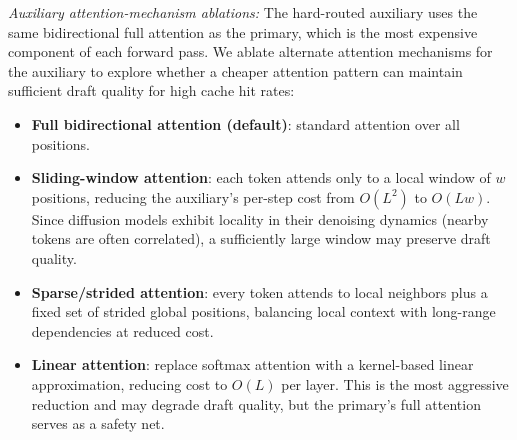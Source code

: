 \documentclass[11pt]{article}
\begin{document}
\emph{Auxiliary attention-mechanism ablations:}
The hard-routed auxiliary uses the same bidirectional full attention as the primary, which is the most expensive component of each forward pass.
We ablate alternate attention mechanisms for the auxiliary to explore whether a cheaper attention pattern can maintain sufficient draft quality for high cache hit rates:
\begin{itemize}[leftmargin=*,itemsep=1pt]
    \item \textbf{Full bidirectional attention (default)}: standard attention over all positions.
    \item \textbf{Sliding-window attention}: each token attends only to a local window of $w$ positions, reducing the auxiliary's per-step cost from $O(L^2)$ to $O(Lw)$.
    Since diffusion models exhibit locality in their denoising dynamics (nearby tokens are often correlated), a sufficiently large window may preserve draft quality.
    \item \textbf{Sparse/strided attention}: every token attends to local neighbors plus a fixed set of strided global positions, balancing local context with long-range dependencies at reduced cost.
    \item \textbf{Linear attention}: replace softmax attention with a kernel-based linear approximation, reducing cost to $O(L)$ per layer.
    This is the most aggressive reduction and may degrade draft quality, but the primary's full attention serves as a safety net.
\end{itemize}

\end{document}
